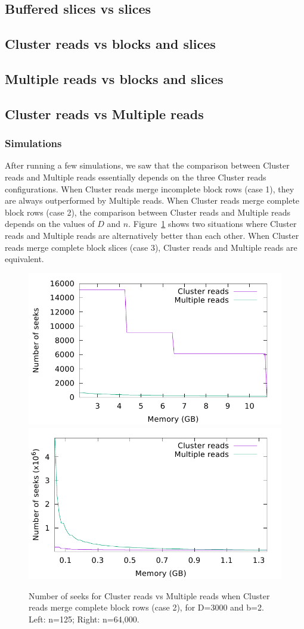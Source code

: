 \documentclass[10pt, conference, compsocconf]{IEEEtran}
\begin{document}
\subsection{Buffered slices vs slices}

\subsection{Cluster reads vs blocks and slices}

\subsection{Multiple reads vs blocks and slices}

\subsection{Cluster reads vs Multiple reads}

\subsubsection{Simulations}
After running a few simulations, we saw that the comparison between
Cluster reads and Multiple reads essentially depends on the three
Cluster reads configurations.  When Cluster reads merge incomplete
block rows (case 1), they are always outperformed by Multiple reads.
When Cluster reads merge complete block rows (case 2), the comparison
between Cluster reads and Multiple reads depends on the values of $D$
and $n$. Figure~\ref{fig:model-comparison} shows two situations where
Cluster reads and Multiple reads are alternatively better than each
other. When Cluster reads merge complete block slices (case 3),
Cluster reads and Multiple reads are equivalent.

\begin{figure}
  \includegraphics[width=0.45\columnwidth]{figures/model-big-brain.pdf}
  \includegraphics[width=0.45\columnwidth]{figures/model-big-brain-rescan.pdf}
  \caption{Number of seeks for Cluster reads vs Multiple reads when
    Cluster reads merge complete block rows (case 2), for D=3000 and
    b=2. Left: n=125; Right: n=64,000.}
  \label{fig:model-comparison}
\end{figure}
\end{document}
